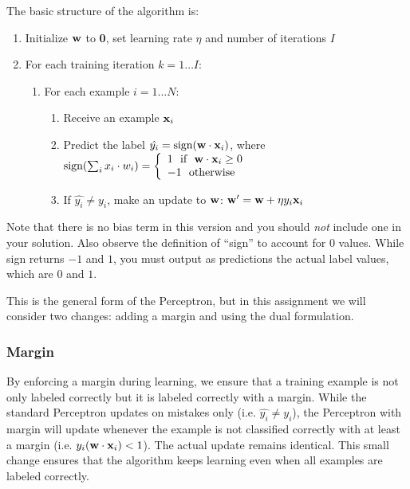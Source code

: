 \documentclass[11pt]{article}
\newcommand{\vw}{{\bf w}}
\newcommand{\vxi}{{\bf x}_i}
\newcommand{\yi}{y_i}
\begin{document}
The basic structure of the algorithm is:
\begin{enumerate}
\item Initialize $\vw$ to {\bf 0}, set learning rate $\eta$ and number of iterations $I$
\item For each training iteration $k = 1 \ldots I$:
\begin{enumerate}
\item For each example $i=1\ldots N$:
\begin{enumerate}
\item Receive an example $\vxi$
\item Predict the label $\hat{\yi} =  \textrm{sign}(\vw \cdot \vxi)$, where
$\textrm{sign}(\sum_i x_i \cdot w_i) =\left\{
     \begin{array}{lr}
       1 ~~  \textrm{if} ~~ \vw \cdot \vxi \ge 0  \\
       -1 ~~ \textrm{otherwise}
     \end{array}
   \right.$
\item If  $\hat{\yi} \ne \yi$, make an update to $\vw$: $\vw' = \vw + \eta \yi \vxi$
\end{enumerate}
\end{enumerate}
\end{enumerate}

Note that there is no bias term in this version and you should \emph{not} include one in your solution. Also observe the definition of ``sign'' to account for 0 values. While sign returns $-1$ and $1$, you must output as predictions the actual label values, which are $0$ and $1$.

This is the general form of the Perceptron, but in this assignment we will consider two changes: adding a margin and using the dual
formulation.

\subsubsection{Margin}
By enforcing a margin during learning, we ensure that a training example is not only labeled correctly but it is labeled correctly with a margin.
While the standard Perceptron updates on mistakes only (i.e. $\hat{\yi} \ne \yi$), the Perceptron with margin will update whenever
the example is not classified correctly with at least a margin (i.e. $\yi (\vw \cdot \vxi) < 1$). The actual update remains identical.
This small change ensures that the algorithm keeps learning even when all examples are labeled correctly.
\end{document}
